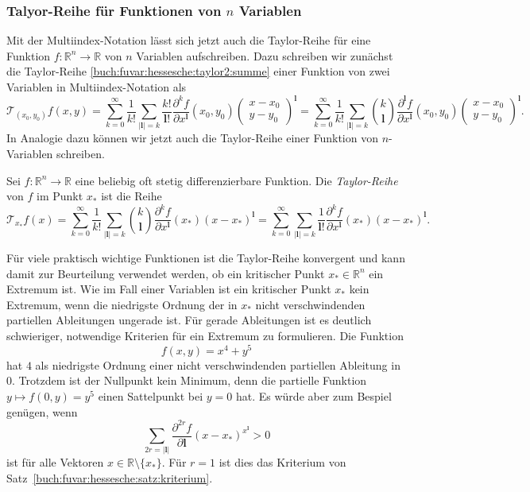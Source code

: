 \subsubsection{Talyor-Reihe für Funktionen von $n$ Variablen}
Mit der Multiindex-Notation lässt sich jetzt auch die Taylor-Reihe
für eine Funktion $f\colon\mathbb{R}^n\to\mathbb{R}$ von $n$ Variablen
aufschreiben.
Dazu schreiben wir zunächst die Taylor-Reihe
\eqref{buch:fuvar:hessesche:taylor2:summe}
einer Funktion von zwei Variablen in Multiindex-Notation als
\[
\mathscr{T}_{(x_0,y_0)}f(x,y)
=
\sum_{k=0}^\infty
\frac{1}{k!}
\sum_{|\mathbf{l}|=k}
\frac{k!}{\mathbf{l}!}
\frac{\partial^k f}{\partial x^{\mathbf{l}}}
(x_0,y_0)
\begin{pmatrix}
x-x_0\\
y-y_0
\end{pmatrix}^{\mathbf{l}}
=
\sum_{k=0}^\infty
\frac{1}{k!}
\sum_{|\mathbf{l}|=k}
\binom{k}{\mathbf{l}}
\frac{\partial^{\mathbf{l}} f}{\partial x^{\mathbf{l}}}(x_0,y_0)
\begin{pmatrix}
x-x_0\\
y-y_0
\end{pmatrix}^{\mathbf{l}}.
\]
In Analogie dazu können wir jetzt auch die Taylor-Reihe einer Funktion
von $n$-Variablen schreiben.

\begin{definition}
Sei $f\colon\mathbb{R}^n\to\mathbb{R}$ eine beliebig oft stetig
differenzierbare Funktion.
Die {\em Taylor-Reihe} von $f$ im Punkt $x_*$ ist die Reihe
\[
\mathscr{T}_{x_*} f(x)
=
\sum_{k=0}^\infty
\frac{1}{k!}
\sum_{|\mathbf{l}|=k}
\binom{k}{\mathbf{l}}
\frac{\partial^k f}{\partial x^{\mathbf{l}}}(x_*) (x-x_*)^{\mathbf{l}}
=
\sum_{k=0}^\infty
\sum_{|\mathbf{l}|=k}
\frac{1}{\mathbf{l}!}
\frac{\partial^k f}{\partial x^{\mathbf{l}}}(x_*) (x-x_*)^{\mathbf{l}}.
\]
\end{definition}

Für viele praktisch wichtige Funktionen ist die Taylor-Reihe konvergent
und kann damit zur Beurteilung verwendet werden, ob ein kritischer Punkt
$x_*\in\mathbb{R}^n$ ein Extremum ist.
Wie im Fall einer Variablen ist ein kritischer Punkt $x_*$ kein Extremum,
wenn die niedrigste Ordnung der in $x_*$ nicht verschwindenden partiellen
Ableitungen ungerade ist.
Für gerade Ableitungen ist es deutlich schwieriger, notwendige Kriterien
für ein Extremum zu formulieren.
Die Funktion
\[
f(x,y)
=
x^4 + y^5
\]
hat $4$ als niedrigste Ordnung einer nicht verschwindenden partiellen
Ableitung in $0$.
Trotzdem ist der Nullpunkt kein Minimum, denn die partielle Funktion
$y\mapsto f(0,y)=y^5$ einen Sattelpunkt bei $y=0$ hat.
Es würde aber zum Bespiel genügen, wenn
\[
\sum_{2r=|\mathbf{l}|}
\frac{\partial^{2r}f}{\partial \mathbf{l}}
(x-x_*)^{x^{\mathbf{l}}}
>
0
\]
ist für alle Vektoren $x\in\mathbb{R}\setminus\{x_*\}$.
Für $r=1$ ist dies das Kriterium von
Satz~\ref{buch:fuvar:hessesche:satz:kriterium}.



